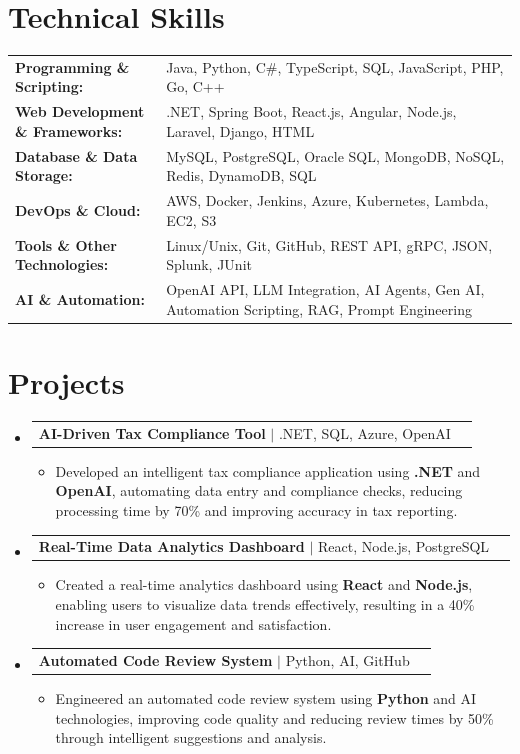 \documentclass[letterpaper,10pt]{article}
\makeatletter
\newcommand{\resumeItem}[1]{
  \item{\fontsize{8pt}{9pt}\selectfont
    #1 \vspace{-3pt}
  }
}
\newcommand{\resumeProjectHeading}[2]{
    \item
    \begin{tabular*}{1.001\textwidth}{l@{\extracolsep{\fill}}r}
      \fontsize{8.5pt}{10pt}#1 & \textbf{\fontsize{8.5pt}{10pt} #2}\\
    \end{tabular*}\vspace{-7pt}
}
\newcommand{\resumeSubHeadingListStart}{\begin{itemize}[leftmargin=0pt, label={}]}
\newcommand{\resumeSubHeadingListEnd}{\end{itemize}}
\newcommand{\resumeItemListStart}{\begin{itemize}[leftmargin=*]}
\newcommand{\resumeItemListEnd}{\end{itemize}\vspace{-5pt}}
\makeatother
\begin{document}
\section{Technical Skills}
        \vspace{-14pt}
        \begin{table}[h]
            \fontsize{8pt}{9pt}\selectfont
            \begin{tabular}{p{0.3\linewidth} p{0.7\linewidth}}
                \textbf{Programming \& Scripting:} & Java, Python, C\#, TypeScript, SQL, JavaScript, PHP, Go, C++ \\
                \textbf{Web Development \& Frameworks:} & .NET, Spring Boot, React.js, Angular, Node.js, Laravel, Django, HTML \\
                \textbf{Database \& Data Storage:} & MySQL, PostgreSQL, Oracle SQL, MongoDB, NoSQL, Redis, DynamoDB, SQL \\
                \textbf{DevOps \& Cloud:} & AWS, Docker, Jenkins, Azure, Kubernetes, Lambda, EC2, S3 \\
                \textbf{Tools \& Other Technologies:} & Linux/Unix, Git, GitHub, REST API, gRPC, JSON, Splunk, JUnit \\
                \textbf{AI \& Automation:} & OpenAI API, LLM Integration, AI Agents, Gen AI, Automation Scripting, RAG, Prompt Engineering \\
            \end{tabular}
        \end{table}
 \vspace{-18pt}

\section{Projects}
    \vspace{-5pt}
    \resumeSubHeadingListStart
          \resumeProjectHeading
            {\textbf{AI-Driven Tax Compliance Tool} $|$ .NET, SQL, Azure, OpenAI}{}
            \resumeItemListStart
                \resumeItem{Developed an intelligent tax compliance application using \textbf{.NET} and \textbf{OpenAI}, automating data entry and compliance checks, reducing processing time by 70\% and improving accuracy in tax reporting.}
            \resumeItemListEnd
        \vspace{-12pt}
    
        \resumeProjectHeading
            {\textbf{Real-Time Data Analytics Dashboard} $|$ React, Node.js, PostgreSQL}{}
        \resumeItemListStart
                \resumeItem{Created a real-time analytics dashboard using \textbf{React} and \textbf{Node.js}, enabling users to visualize data trends effectively, resulting in a 40\% increase in user engagement and satisfaction.}
        \resumeItemListEnd
      \vspace{-12pt}
      \resumeProjectHeading
        {\textbf{Automated Code Review System} $|$ Python, AI, GitHub}{}
    \resumeItemListStart
            \resumeItem{Engineered an automated code review system using \textbf{Python} and AI technologies, improving code quality and reducing review times by 50\% through intelligent suggestions and analysis.}
    \resumeItemListEnd
    \resumeSubHeadingListEnd
\end{document}
